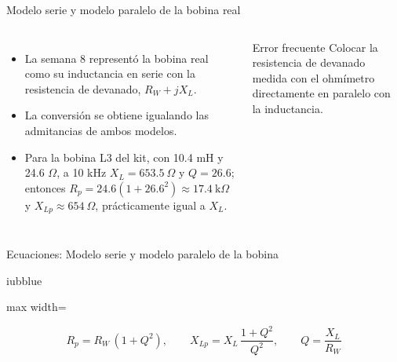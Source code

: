 \documentclass[aspectratio=169,11pt,xcolor={table}]{beamer}
\begin{document}
\begin{frame}{Modelo serie y modelo paralelo de la bobina real}
\begin{columns}[c,onlytextwidth]
\small
\begin{itemize}\setlength{\itemsep}{4pt}
  \item La semana 8 representó la bobina real como su inductancia en serie con la resistencia de devanado, $R_W + jX_L$.
  \item La conversión se obtiene igualando las admitancias de ambos modelos.
  \item Para la bobina L3 del kit, con 10.4 mH y 24.6 \ensuremath{\Omega}, a 10 kHz $X_L = 653.5\ \Omega$ y $Q = 26.6$; entonces $R_p = 24.6(1 + 26.6^2) \approx 17.4\ \text{k}\Omega$ y $X_{Lp} \approx 654\ \Omega$, prácticamente igual a $X_L$.
\end{itemize}
\begin{cardO}{Error frecuente}
\footnotesize Colocar la resistencia de devanado medida con el ohmímetro directamente en paralelo con la inductancia.
\end{cardO}
\end{columns}
\end{frame}

\begin{frame}{{\normalsize Ecuaciones: Modelo serie y modelo paralelo de la bobina}}
\begin{cajaplana}{iubblue}
\centering
\begin{adjustbox}{max width=\linewidth}
\begin{minipage}{1.20\linewidth}
{\large
\begin{equation*}
  R_p = R_W\,(1 + Q^{2}), \qquad X_{Lp} = X_L\,\frac{1 + Q^{2}}{Q^{2}}, \qquad Q = \frac{X_L}{R_W}
\end{equation*}
}
\end{minipage}
\end{adjustbox}
\end{cajaplana}
\end{frame}
\end{document}
